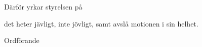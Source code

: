 \documentclass[../_main/handlingar.tex]{subfiles}
\begin{document}
\motionssvar

Därför yrkar styrelsen på

\begin{attsatser}
    \att det heter jävligt, inte jövligt, samt
    \att avslå motionen i sin helhet.
\end{attsatser}

\begin{signatures}{1}
    \ist
    \signature{\ordf}{Ordförande}
\end{signatures}
\end{document}
